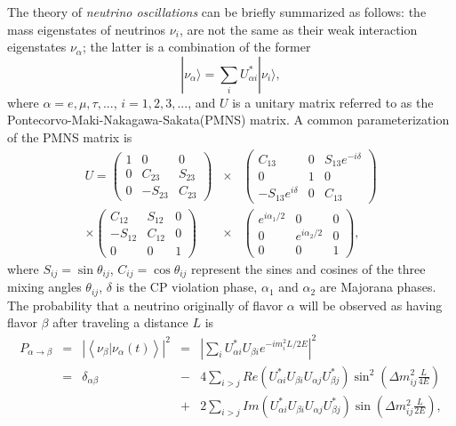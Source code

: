 The theory of \emph{neutrino oscillations} can be briefly summarized as follows: the mass eigenstates of neutrinos $\nu_{i}$, are not the same as their weak interaction eigenstates $\nu_{\alpha}$; the latter is a combination of the former
\begin{equation}
  \label{eq:osci}
  |\nu_{\alpha}\rangle=\sum_{i}U^{*}_{\alpha i}|\nu_{i}\rangle,
\end{equation}
where $\alpha=e,\mu,\tau, ...$, $i=1,2,3, ...$, and $U$ is a unitary matrix referred to as the Pontecorvo-Maki-Nakagawa-Sakata(PMNS) matrix. A common parameterization of the PMNS matrix is
\begin{eqnarray*}
  \label{eq:pmns}
  U = \left(\begin{array}{ccc}
      1 & 0 & 0 \\ 0 & C_{23} & S_{23} \\ 0 & -S_{23} & C_{23}
    \end{array}\right) &\times&
  \left(\begin{array}{ccc}
      C_{13} & 0 & S_{13}e^{-i\delta} \\ 
      0 & 1 & 0 \\ -S_{13}e^{i\delta} & 0 & C_{13}
    \end{array}\right) \\\times
  \left(\begin{array}{ccc}
       C_{12} & S_{12} & 0 \\ -S_{12} & C_{12} & 0 \\ 0 & 0 & 1
    \end{array}\right) &\times&
  \left(\begin{array}{ccc}
      e^{i\alpha_1/2} & 0 & 0 \\ 0 & e^{i\alpha_2/2} & 0 \\ 0 & 0 & 1
    \end{array}\right),
\end{eqnarray*}
where $S_{ij} = \sin\theta_{ij}$, $C_{ij} = \cos\theta_{ij}$ represent the sines and cosines of the three mixing angles $\theta_{ij}$, $\delta$ is the CP violation phase, $\alpha_1$ and $\alpha_2$ are Majorana phases. The probability that a neutrino originally of flavor $\alpha$ will be observed as having flavor $\beta$ after traveling a distance $L$ is
\begin{equation}
  \label{eq:pa2b}
  \begin{array}{ccccl}
    P_{\alpha \rightarrow \beta} &=& \left| \left\langle                 \nu_{\beta}|\nu_{\alpha}(t) \right\rangle \right|^{2} &=&     {\displaystyle \left|       \sum_{i}U_{\alpha i}^{*}U_{\beta i}e^{-i           m_{i}^2 L/2E} \right|^{2}}\\ &=& \delta_{\alpha\beta} &-&     4{\displaystyle \sum_{i>j}Re(U_{\alpha         i}^{*}U_{\beta         i}U_{\alpha j}U_{\beta j}^{*})\sin^{2}(\Delta     m_{ij}^{2}       \frac{L}{4E})}\\ & & &+& {\displaystyle 2\sum_{i>j}Im(U_{\alpha         i}^{*}U_{\beta i}U_{\alpha j}U_{\beta j}^{*})\sin(\Delta       m_{ij}^{2}\frac{L}{2E})},
  \end{array}
\end{equation}
